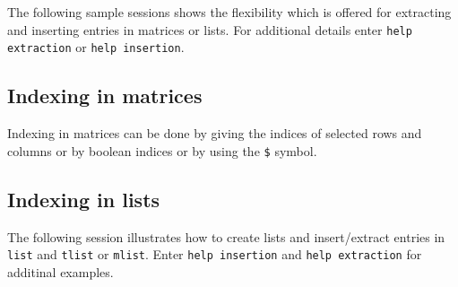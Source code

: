 The following sample sessions shows the flexibility which is offered
for extracting and inserting entries in matrices or lists.
For additional details enter \verb!help extraction! 
or \verb!help insertion!.
\subsection{Indexing in matrices}
Indexing in matrices can be done by giving the indices of selected
rows and columns or by boolean indices or by using the \verb!$! symbol.


\subsection{Indexing in lists}
The following session illustrates how to create lists and
insert/extract entries in {\tt list} and {\tt tlist} or {\tt mlist}.
Enter {\tt help insertion} and {\tt help extraction} for additinal examples.

